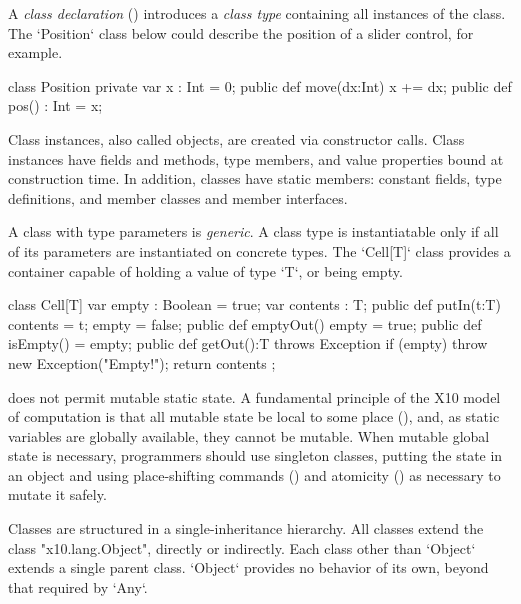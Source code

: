 {A {\em class declaration} () introduces a {\em class type}
containing all instances of the class.  The \xcd`Position` class below
could describe the position of a slider control, for example.

\begin{xten}
class Position {
  private var x : Int = 0;
  public def move(dx:Int) { x += dx; }
  public def pos() : Int = x;
}
\end{xten}
%

Class instances, also called objects, are created via constructor calls. Class
instances have fields and methods, type members, and value properties bound at
construction time. In addition, classes have static members: constant fields,
type definitions, and member classes and member interfaces.

A class with type parameters is {\em generic}. A class type is instantiatable
only if all of its parameters are instantiated on concrete types.  The
\xcd`Cell[T]` class provides a container capable of holding a value of type
\xcd`T`, or being empty.

\begin{xten}
class Cell[T] {
  var empty : Boolean = true;
  var contents : T;
  public def putIn(t:T) { 
    contents = t; empty = false; 
  }
  public def emptyOut() { empty = true; }
  public def isEmpty() = empty;
  public def getOut():T throws Exception {
     if (empty) throw new Exception("Empty!");
     return contents ;
  }
}
\end{xten}
%


\Xten{} does not permit mutable static state. A fundamental principle of the
X10 model of computation is that all mutable state be local to some place
(), and, as static variables are globally available, they
cannot be mutable. When mutable global state is necessary, programmers should
use singleton classes, putting the state in an object and using place-shifting
commands () and atomicity () as necessary
to mutate it safely.


Classes are structured in a single-inheritance hierarchy. All classes extend
the class \xcd"x10.lang.Object", directly or indirectly. Each class other than
\xcd`Object` extends a single parent class.  \xcd`Object` provides no behavior
of its own, beyond that required by \xcd`Any`.

}
